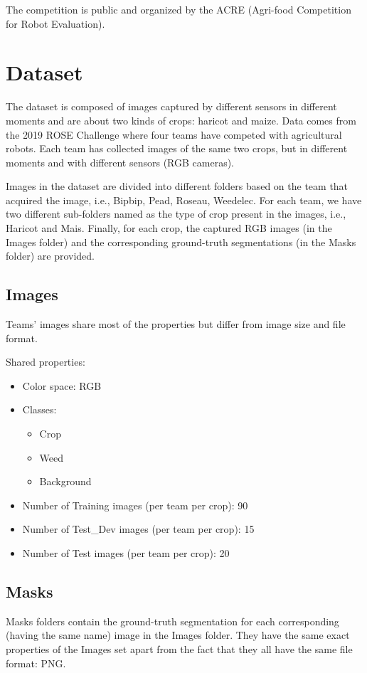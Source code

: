 \documentclass[12pt,a4paper]{report}
\begin{document}
The competition is public and  organized by the ACRE (Agri-food Competition for Robot Evaluation).

	\section{Dataset}
The dataset is composed of images captured by different sensors in different moments and are about two kinds of crops: haricot and maize. Data comes from the 2019 ROSE Challenge where four teams have competed with agricultural robots. Each team has collected images of the same two crops, but in different moments and with different sensors (RGB cameras).

Images in the dataset are divided into different folders based on the team that acquired the image, i.e., Bipbip, Pead, Roseau, Weedelec. For each team, we have two different sub-folders named as the type of crop present in the images, i.e., Haricot and Mais. Finally, for each crop, the captured RGB images (in the Images folder) and the corresponding ground-truth segmentations (in the Masks folder) are provided.
	
	\subsection{Images}
Teams' images share most of the properties but differ from image size and file format.

Shared properties:
\begin{itemize}

\item{Color space: RGB}
\item{Classes:}
\begin{itemize}
\item{Crop}
\item{Weed}
\item{Background}
\end{itemize}
\item{Number of Training images (per team per crop): 90}
\item{Number of Test\_Dev images (per team per crop): 15}
\item{Number of Test images (per team per crop): 20}
\end{itemize}
	\subsection{Masks}
Masks folders contain the ground-truth segmentation for each corresponding (having the same name) image in the Images folder. They have the same exact properties of the Images set apart from the fact that they all have the same file format: PNG.
\end{document}
